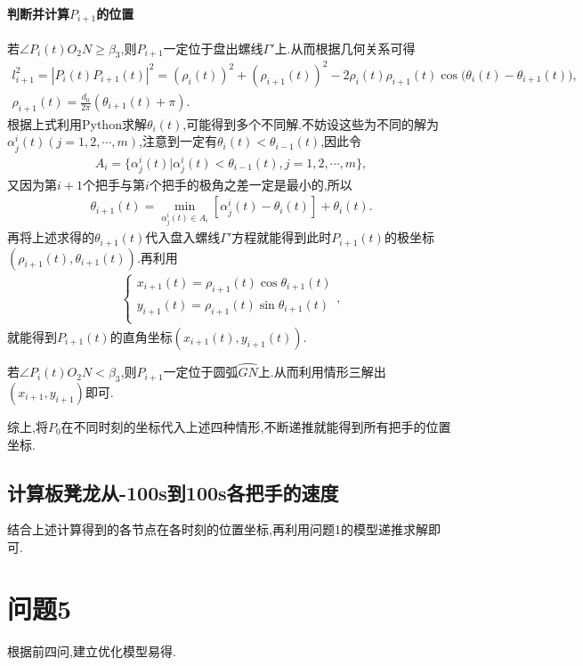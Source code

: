 \documentclass[lang=cn,newtx,10pt,scheme=chinese]{../Template/elegantbook}
\begin{document}
\subsubsection{判断并计算$P_{i+1}$的位置}

若$\angle P_i(t)O_2N\geq \beta_3$,则$P_{i+1}$一定位于盘出螺线$\varGamma'$上.从而根据几何关系可得
\begin{gather}
l_{i+1}^{2}=|P_i(t)P_{i+1}(t)|^2=(\rho _i(t))^2+(\rho _{i+1}(t))^2-2\rho _i(t)\rho _{i+1}(t)\cos\mathrm{(}\theta _i(t)-\theta _{i+1}(t)),
\\
\rho _{i+1}(t)=\frac{d_0}{2\pi}\left( \theta _{i+1}(t)+\pi \right) .
\end{gather}
根据上式利用Python求解\(\theta _{i}(t)\),可能得到多个不同解.不妨设这些为不同的解为\(\alpha _{j}^{i}(t) (j = 1,2,\cdots ,m)\),注意到一定有\(\theta _{i}(t)<\theta _{i-1}(t)\),因此令
\begin{align}
A_i = \{ \alpha _{j}^{i}(t) |\alpha _{j}^{i}(t) <\theta _{i-1}(t),j = 1,2,\cdots ,m \},
\end{align}
又因为第\(i + 1\)个把手与第$i$个把手的极角之差一定是最小的,所以
\begin{align}
\theta _{i+1}(t)=\underset{\alpha _{j}^{i}(t)\in A_i}{\min}\left[ \alpha _{j}^{i}\left( t \right) -\theta _i\left( t \right) \right] +\theta _i\left( t \right) .
\end{align}
再将上述求得的\(\theta _{i+1}(t)\)代入盘入螺线$\varGamma'$方程就能得到此时\(P_{i+1}(t)\)的极坐标\((\rho _{i+1}(t),\theta _{i+1}(t))\).再利用
\begin{align}
\begin{cases}
x_{i+1}(t)=\rho _{i+1}(t)\cos \theta _{i+1}(t)\\
y_{i+1}(t)=\rho _{i+1}(t)\sin \theta _{i+1}(t)\\
\end{cases}, 
\end{align}
就能得到\(P_{i+1}(t)\)的直角坐标\((x_{i+1}(t),y_{i+1}(t))\).

若$\angle P_i(t)O_2N< \beta_3$,则$P_{i+1}$一定位于圆弧$\wideparen{GN}$上.从而利用情形三解出$(x_{i+1},y_{i+1})$即可.



综上,将$P_0$在不同时刻的坐标代入上述四种情形,不断递推就能得到所有把手的位置坐标.

\section{计算板凳龙从-100s到100s各把手的速度}

结合上述计算得到的各节点在各时刻的位置坐标,再利用问题1的模型递推求解即可.



\chapter{问题5}

根据前四问,建立优化模型易得.
\end{document}
